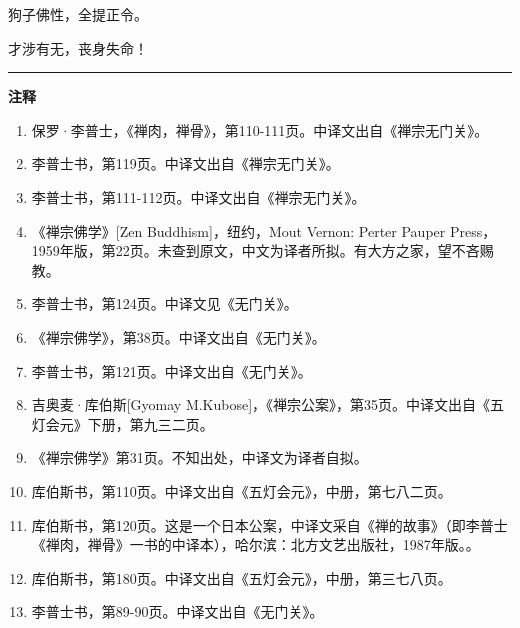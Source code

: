 \documentclass[
  12pt,
  twoside,
  openright,
  oldfontcommands,
]{memoir}
\begin{document}
狗子佛性，全提正令。

才涉有无，丧身失命！

{\footnotesize\setlength{\parindent}{0pt}%
\noindent\textcolor{rulegray}{\rule{0.35\linewidth}{0.3pt}}\par\vspace{2pt}
\noindent\textbf{注释}\par\vspace{3pt}
\begin{enumerate}
\label{fn:Chapter09-1}{}
\item 保罗·李普士，《禅肉，禅骨》，第110-111页。中译文出自《禅宗无门关》。
\label{fn:Chapter09-2}{}
\item 李普士书，第119页。中译文出自《禅宗无门关》。
\label{fn:Chapter09-3}{}
\item 李普士书，第111-112页。中译文出自《禅宗无门关》。
\label{fn:Chapter09-4}{}
\item 《禅宗佛学》[Zen Buddhism]，纽约，Mout Vernon: Perter Pauper Press，1959年版，第22页。未查到原文，中文为译者所拟。有大方之家，望不吝赐教。
\label{fn:Chapter09-5}{}
\item 李普士书，第124页。中译文见《无门关》。
\label{fn:Chapter09-6}{}
\item 《禅宗佛学》，第38页。中译文出自《无门关》。
\label{fn:Chapter09-7}{}
\item 李普士书，第121页。中译文出自《无门关》。
\label{fn:Chapter09-8}{}
\item 吉奥麦·库伯斯[Gyomay M.Kubose]，《禅宗公案》，第35页。中译文出自《五灯会元》下册，第九三二页。
\label{fn:Chapter09-9}{}
\item 《禅宗佛学》第31页。不知出处，中译文为译者自拟。
\label{fn:Chapter09-10}{}
\item 库伯斯书，第110页。中译文出自《五灯会元》，中册，第七八二页。
\label{fn:Chapter09-11}{}
\item 库伯斯书，第120页。这是一个日本公案，中译文采自《禅的故事》（即李普士《禅肉，禅骨》一书的中译本），哈尔滨：北方文艺出版社，1987年版。。
\label{fn:Chapter09-12}{}
\item 库伯斯书，第180页。中译文出自《五灯会元》，中册，第三七八页。
\label{fn:Chapter09-13}{}
\item 李普士书，第89-90页。中译文出自《无门关》。
\end{enumerate}
}
\end{document}
